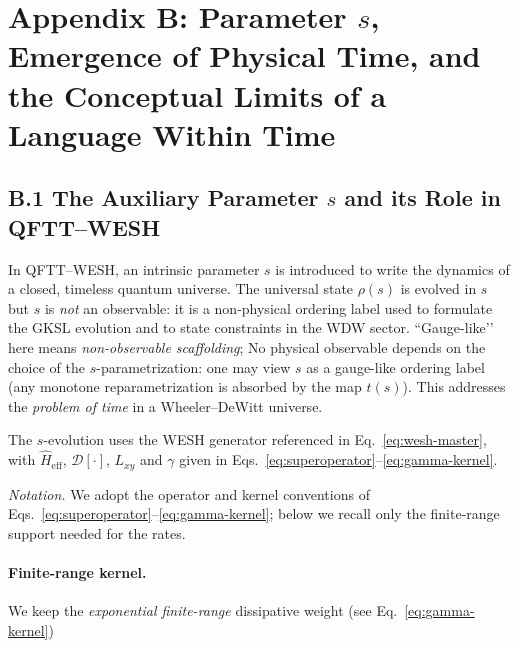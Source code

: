 \documentclass[12pt,a4paper]{article}
\newcommand{\eff}{\mathrm{eff}}
\numberwithin{equation}{section}
\begin{document}
\vspace{1cm}

\section*{Appendix B: Parameter \(s\), Emergence of Physical Time, and the Conceptual Limits of a Language Within Time}

\vspace{0.8cm}

\subsection*{B.1 The Auxiliary Parameter $s$ and its Role in QFTT--WESH}
\vspace{0.5cm}
\begingroup
\setcounter{equation}{0}
\renewcommand{\theequation}{B.\arabic{equation}}
\renewcommand{\theHequation}{B.\arabic{equation}}

In QFTT--WESH, an intrinsic parameter $s$ is introduced to write the dynamics of a closed, timeless quantum universe. The universal state $\rho(s)$ is evolved in $s$ but $s$ is \emph{not} an observable: it is a non-physical ordering label used to formulate the GKSL evolution and to state constraints in the WDW sector. “Gauge-like’’ here means \emph{non-observable scaffolding}; No physical observable depends on the choice of the $s$-parametrization: one may view $s$ as a gauge-like ordering label (any monotone reparametrization is absorbed by the map $t(s)$). This addresses the \emph{problem of time} in a Wheeler--DeWitt universe.

\vspace{0.5cm}

\noindent The $s$-evolution uses the WESH generator referenced in Eq.~\eqref{eq:wesh-master}, with $\hat H_{\eff}$, $\mathcal D[\cdot]$, $L_{xy}$ and $\gamma$ given in Eqs.~\eqref{eq:superoperator}–\eqref{eq:gamma-kernel}.

\vspace{0.5cm}

\noindent\textit{Notation.} We adopt the operator and kernel conventions of Eqs.~\eqref{eq:superoperator}–\eqref{eq:gamma-kernel}; below we recall only the finite-range support needed for the rates.

\paragraph{Finite-range kernel.}
We keep the \emph{exponential finite-range} dissipative weight (see Eq.~\eqref{eq:gamma-kernel})
\end{document}
